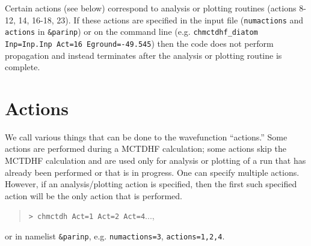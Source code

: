 \documentclass[10pt,leqno, oneside]{book}
\begin{document}
Certain actions (see below) correspond to analysis or plotting routines (actions 8-12, 14, 16-18, 23).  If these actions are specified
in the input file (\verb#numactions# and \verb#actions# in \verb#&parinp#) or on the command line
 (e.g. \verb#chmctdhf_diatom Inp=Inp.Inp Act=16 Eground=-49.545#)
then the code does not perform propagation and instead terminates after the analysis or plotting routine is complete.




\chapter{Actions}

We call various things that can be done to the wavefunction ``actions.''  
Some actions are performed during a MCTDHF calculation; some actions skip the MCTDHF calculation and are used only for analysis or plotting of a run
that has already been performed or that is in progress.  
One can specify multiple actions.  However, if an analysis/plotting action is specified, then the first such specified action will be the only action that is performed.
\begin{quote}
\verb#> chmctdh Act=1 Act=2 Act=4#..., 
\end{quote}
or in namelist \verb#&parinp#, e.g. \verb#numactions=3#, \verb#actions=1,2,4#.
\end{document}
